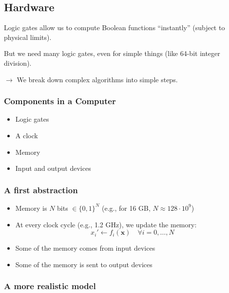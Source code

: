 \documentclass[12pt]{article}
\begin{document}
\subsection{Hardware}

Logic gates allow us to compute Boolean functions ``instantly'' (subject to physical limits).

But we need many logic gates, even for simple things (like 64-bit integer division).

$\rightarrow$ We break down complex algorithms into simple steps.

\subsubsection{Components in a Computer}
\begin{itemize}
    \item Logic gates
    \item A clock
    \item Memory
    \item Input and output devices
\end{itemize}
\subsubsection{A first abstraction}

\begin{itemize}
  \item Memory is $N$ bits $\in \{0, 1\}^N$ (e.g., for 16 GB, $N \approx 128 \cdot 10^9$)
  \item At every clock cycle (e.g., 1.2 GHz), we update the memory:
  \[
  x_i' \leftarrow f_i(\mathbf{x}) \quad \forall i = 0, \ldots, N
  \]
  \item Some of the memory comes from input devices
  \item Some of the memory is sent to output devices
\end{itemize}

\subsubsection{A more realistic model}
\end{document}
